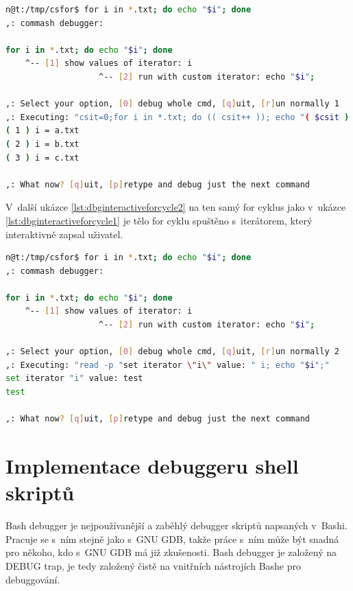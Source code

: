 \documentclass[thesis=M,czech]{FITthesis}[2012/06/26]
\begin{document}
\noindent
\begin{minipage}{\linewidth}
\begin{lstlisting}[language=bash, caption={Debugger interaktivního shellu - výpis hodnot iterátoru for cyklu }, label={lst:dbginteractiveforcycle1}]
n@t:/tmp/csfor$ for i in *.txt; do echo "$i"; done
,: commash debugger:

for i in *.txt; do echo "$i"; done
    ^-- [1] show values of iterator: i
                   ^-- [2] run with custom iterator: echo "$i";

,: Select your option, [0] debug whole cmd, [q]uit, [r]un normally 1
,: Executing: "csit=0;for i in *.txt; do (( csit++ )); echo "( $csit ) i = $i"; done"
( 1 ) i = a.txt
( 2 ) i = b.txt
( 3 ) i = c.txt

,: What now? [q]uit, [p]retype and debug just the next command
\end{lstlisting}
\end{minipage}

V~další ukázce \ref{lst:dbginteractiveforcycle2} na ten samý for cyklus jako v~ukázce \ref{lst:dbginteractiveforcycle1} je tělo for cyklu spuštěno s~iterátorem, který interaktivně zapsal uživatel.

\noindent
\begin{minipage}{\linewidth}
\begin{lstlisting}[language=bash, caption={Debugger interaktivního shellu - změna iterátoru for cyklu}, label={lst:dbginteractiveforcycle2}]
n@t:/tmp/csfor$ for i in *.txt; do echo "$i"; done
,: commash debugger:

for i in *.txt; do echo "$i"; done
    ^-- [1] show values of iterator: i
                   ^-- [2] run with custom iterator: echo "$i";

,: Select your option, [0] debug whole cmd, [q]uit, [r]un normally 2
,: Executing: "read -p "set iterator \"i\" value: " i; echo "$i";"
set iterator "i" value: test
test

,: What now? [q]uit, [p]retype and debug just the next command
\end{lstlisting}
\end{minipage}





\section{Implementace debuggeru shell skriptů}

Bash debugger je nejpoužívanější a zaběhlý debugger skriptů napsaných v~Bashi. Pracuje se s~ním stejně jako s~GNU GDB, takže práce s~ním může být snadná pro někoho, kdo s~GNU GDB má již zkušenosti. Bash debugger je založený na DEBUG trap, je tedy založený čistě na vnitřních nástrojích Bashe pro debuggování.
\end{document}
